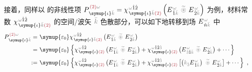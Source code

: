 接着，同样以  的非线性项 $P^{\;\! \textcolor{Maroon}{(2)} \mathcolor{gray}{\omega}}_{\;\! \symup{\iota}\mathcolor{gray}{\bar{k}}} = \chi^{\;\! \mathcolor{gray}{\omega} \hat{1} \hat{2}}_{\;\! \symup{\iota} \mathcolor{gray}{\bar{k}} \textcolor{Maroon}{(2)}} \left( E^{\;\!\mathcolor{gray}{\omega}}_{\;\! \hat{1} \mathcolor{gray}{\bar{k}}} ~\mathcolor{gray}{\widetilde \circledast}~ E^{\;\!\mathcolor{gray}{\omega}}_{\;\! \hat{2} \mathcolor{gray}{\bar{k}}} \right)$ 为例，材料常数 $\chi^{\;\! \mathcolor{gray}{\omega} \hat{1} \hat{2}}_{\;\! \symup{\iota} \mathcolor{gray}{\bar{k}} \textcolor{Maroon}{(2)}}$ 的空间/波矢 $\mathcolor{gray}{\bar{k}}$ 色散部分，可以如下地转移到场 $E^{\;\!\mathcolor{gray}{\omega}}_{\;\! \hat{n} \mathcolor{gray}{\bar{k}}}$ 中
\begin{subequations}
\begin{align}
	P^{\;\! \textcolor{Maroon}{(2)} \mathcolor{gray}{\omega}}_{\;\! \symup{\iota}\mathcolor{gray}{\bar{k}}} =&~ {\symup{\varepsilon_0}} \chi^{\;\! \mathcolor{gray}{\omega} \hat{1} \hat{2}}_{\;\! \symup{\iota} \mathcolor{gray}{\bar{k}} \textcolor{Maroon}{(2)}} \left( E^{\;\!\mathcolor{gray}{\omega}}_{\;\! \hat{1} \mathcolor{gray}{\bar{k}}} ~\mathcolor{gray}{\widetilde \circledast}~ E^{\;\!\mathcolor{gray}{\omega}}_{\;\! \hat{2} \mathcolor{gray}{\bar{k}}} \right) \\ =&~ {\symup{\varepsilon_0}} \left\{ \chi^{\;\! \mathcolor{gray}{\omega} \hat{1} \hat{2}}_{\;\! \symup{\iota} \textcolor{Maroon}{(2)}} \left( E^{\;\!\mathcolor{gray}{\omega}}_{\;\! \hat{1} \mathcolor{gray}{\bar{k}}} ~\mathcolor{gray}{\widetilde \circledast}~ E^{\;\!\mathcolor{gray}{\omega}}_{\;\! \hat{2} \mathcolor{gray}{\bar{k}}} \right) + \chi^{\;\! \mathcolor{gray}{\omega} \hat{1} \hat{2} \mathcolor{gray}{\hat{3}}}_{\;\! \symup{\iota} \textcolor{Maroon}{(2)}} \left( E^{\;\!\mathcolor{gray}{\omega}}_{\;\! \mathcolor{gray}{\hat{3}} \hat{1} \mathcolor{gray}{\bar{k}}} ~\mathcolor{gray}{\widetilde \circledast}~ E^{\;\!\mathcolor{gray}{\omega}}_{\;\! \hat{2} \mathcolor{gray}{\bar{k}}} \right) + \cdots \right\} \label{P(2)_wk}
	\\ :=&~ {\symup{\varepsilon_0}} \left\{ \chi^{\;\! \mathcolor{gray}{\omega} \hat{1} \hat{2}}_{\;\! \symup{\iota} \textcolor{Maroon}{(2)}} \left( E^{\;\!\mathcolor{gray}{\omega}}_{\;\! \hat{1} \mathcolor{gray}{\bar{k}}} ~\mathcolor{gray}{\widetilde \circledast}~ E^{\;\!\mathcolor{gray}{\omega}}_{\;\! \hat{2} \mathcolor{gray}{\bar{k}}} \right) + \chi^{\;\! \mathcolor{gray}{\omega} \hat{1} \hat{2} \mathcolor{gray}{\hat{3}}}_{\;\! \symup{\iota} \textcolor{Maroon}{(2)}} \left[ \left( \mathcolor{gray}{k_{\hat{3}}} E^{\;\!\mathcolor{gray}{\omega}}_{\;\! \hat{1} \mathcolor{gray}{\bar{k}}} \right) ~\mathcolor{gray}{\widetilde \circledast}~ E^{\;\!\mathcolor{gray}{\omega}}_{\;\! \hat{2} \mathcolor{gray}{\bar{k}}} \right] + \cdots \right\}~,
\end{align}
\end{subequations}
